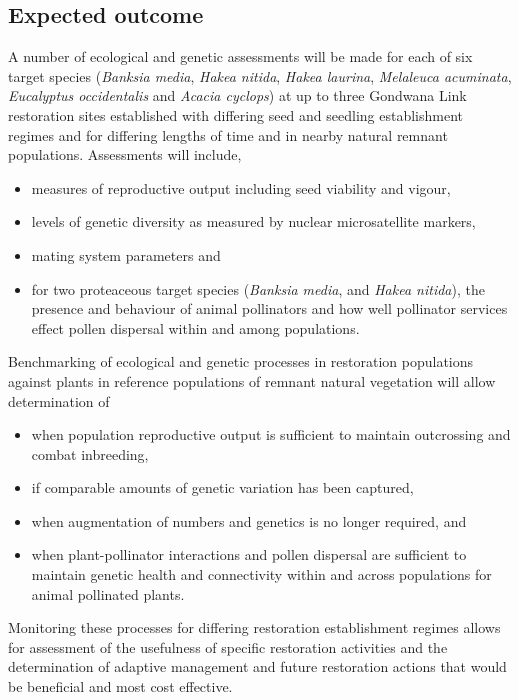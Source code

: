 \documentclass[version=last,
    paper=a4, %
    10pt, %
    usenames,
    dvipsnames,
    oneside, %
    headings=openany, %
    DIV=15 %
]{scrbook}
\begin{document}
\subsection*{Expected outcome}

A number of ecological and genetic assessments will be made for each of
six target species (\emph{Banksia media}, \emph{Hakea nitida},
\emph{Hakea laurina}, \emph{Melaleuca acuminata}, \emph{Eucalyptus
occidentalis} and \emph{Acacia cyclops}) at up to three Gondwana Link
restoration sites established with differing seed and seedling
establishment regimes and for differing lengths of time and in nearby
natural remnant populations. Assessments will include,

\begin{itemize}
\itemsep1pt\parskip0pt
\item
  measures of reproductive output including seed viability and vigour,
\item
  levels of genetic diversity as measured by nuclear microsatellite
  markers,
\item
  mating system parameters and
\item
  for two proteaceous target species (\emph{Banksia media}, and
  \emph{Hakea nitida}), the presence and behaviour of animal pollinators
  and how well pollinator services effect pollen dispersal within and
  among populations.
\end{itemize}

Benchmarking of ecological and genetic processes in restoration
populations against plants in reference populations of remnant natural
vegetation will allow determination of

\begin{itemize}
\itemsep1pt\parskip0pt
\item
  when population reproductive output is sufficient to maintain
  outcrossing and combat inbreeding,
\item
  if comparable amounts of genetic variation has been captured,
\item
  when augmentation of numbers and genetics is no longer required, and
\item
  when plant-pollinator interactions and pollen dispersal are sufficient
  to maintain genetic health and connectivity within and across
  populations for animal pollinated plants.
\end{itemize}

Monitoring these processes for differing restoration establishment
regimes allows for assessment of the usefulness of specific restoration
activities and the determination of adaptive management and future
restoration actions that would be beneficial and most cost effective.
\end{document}
